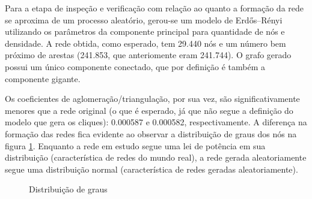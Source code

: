 Para a etapa de inspeção e verificação com relação ao quanto a formação da rede se aproxima de um processo aleatório, gerou-se um modelo de Erdős–Rényi utilizando os parâmetros da componente principal para quantidade de nós e densidade. A rede obtida, como esperado, tem 29.440 nós e um número bem próximo de arestas (241.853, que anteriomente eram 241.744). O grafo gerado possui um único componente conectado, que por definição é também a componente gigante.

Os coeficientes de aglomeração/triangulação, por sua vez, são significativamente menores que a rede original (o que é esperado, já que não segue a definição do modelo que gera os cliques): 0.000587 e 0.000582, respectivamente. A diferença na formação das redes fica evidente ao observar a distribuição de graus dos nós na figura \ref{fig:comparacao}. Enquanto a rede em estudo segue uma lei de potência em sua distribuição (característica de redes do mundo real), a rede gerada aleatoriamente segue uma distribuição normal (característica de redes geradas aleatoriamente).


\begin{figure}[H]
	\centering
    		\hfill
  	\caption{Distribuição de graus}  
  	\label{fig:comparacao}
\end{figure}	
	
